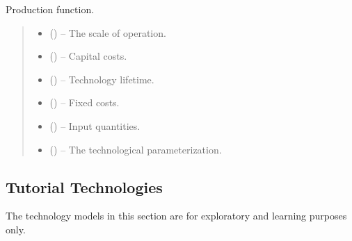\documentclass[letterpaper,10pt,english]{sphinxmanual}
\begin{document}
\begin{fulllineitems}
\label{\detokenize{technology:technology.transport_model.production}}
\pysigstartsignatures
{}
\pysigstopsignatures
\sphinxAtStartPar
Production function.
\begin{quote}\begin{description}
\begin{itemize}
\item {} 
\sphinxAtStartPar
{} () – The scale of operation.

\item {} 
\sphinxAtStartPar
{} () – Capital costs.

\item {} 
\sphinxAtStartPar
{} () – Technology lifetime.

\item {} 
\sphinxAtStartPar
{} () – Fixed costs.

\item {} 
\sphinxAtStartPar
{} () – Input quantities.

\item {} 
\sphinxAtStartPar
{} () – The technological parameterization.

\end{itemize}

\end{description}\end{quote}

\end{fulllineitems}



\subsection{Tutorial Technologies}
\label{\detokenize{technology:tutorial-technologies}}
\sphinxAtStartPar
The technology models in this section are for exploratory and learning purposes only.
\end{document}
